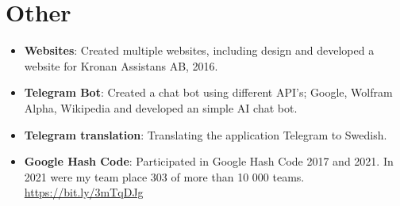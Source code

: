 \documentclass[letterpaper,11pt]{article}
\newcommand{\resumeItem}[2]{
  \item\small{
    \textbf{#1}{: #2 \vspace{-2pt}}
  }
}
\newcommand{\resumeSubItem}[2]{\resumeItem{#1}{#2}\vspace{-4pt}}
\newcommand{\resumeSubHeadingListStart}{\begin{itemize}[leftmargin=*]}
\newcommand{\resumeSubHeadingListEnd}{\end{itemize}}
\begin{document}
\section{Other}
  \resumeSubHeadingListStart
    \resumeSubItem{Websites}
      {Created multiple websites, including design and developed a website for Kronan Assistans AB, 2016.}
    \resumeSubItem{Telegram Bot}
      {Created a chat bot using different API's; Google, Wolfram Alpha, Wikipedia and developed an simple AI chat bot.}
    \resumeSubItem{Telegram translation}
      {Translating the application Telegram to Swedish.}
    \resumeSubItem{Google Hash Code}
      {Participated in Google Hash Code 2017 and 2021. In 2021 were my team place 303 of more than 10 000 teams. \href{https://bit.ly/3mTqDJg}{https://bit.ly/3mTqDJg}}
  \resumeSubHeadingListEnd


\end{document}
